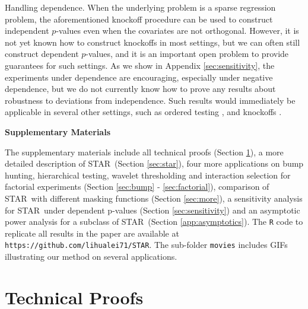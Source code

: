 \documentclass{biometrika}
\renewcommand{\star}{STAR}
\newcommand{\website}{\texttt{https://github.com/lihualei71/STAR}}
\newcommand{\1}{\mathbf{1}}
\begin{document}
\vspace{0.05in}

Handling dependence.
When the underlying problem is a sparse regression problem, the aforementioned knockoff procedure can be used to construct independent $p$-values even when the covariates are not orthogonal.
However, it is not yet known how to construct knockoffs in most settings, but we can often still construct dependent $p$-values, and it is an important open problem to provide guarantees for such settings. 
As we show in Appendix \ref{sec:sensitivity}, the experiments under dependence are encouraging, especially under negative dependence, but we do not currently know how to prove any results about robustness to deviations from independence. Such results would immediately be applicable in several other settings, such as ordered testing \citep{li2016accumulation}, and knockoffs \citep{barber15}.




\newpage
\allowdisplaybreaks
\appendix

\begin{center}
  \begin{Large}
    \textbf{Supplementary Materials}
  \end{Large}
\end{center}

The supplementary materials include all technical proofs (Section \ref{sec:proofs}), a more detailed description of \star ~(Section \ref{sec:star}), four more applications on bump hunting, hierarchical testing, wavelet thresholding and interaction selection for factorial experiments (Section \ref{sec:bump} - \ref{sec:factorial}), comparison of \star ~with different masking functions (Section \ref{sec:more}), a sensitivity analysis for \star ~under dependent p-values (Section \ref{sec:sensitivity}) and an asymptotic power analysis for a subclass of \star ~(Section \ref{app:asymptotics}). The \texttt{R} code to replicate all results in the paper are available at \website. The sub-folder \texttt{movies} includes GIFs illustrating our method on several applications.

\section{Technical Proofs}\label{sec:proofs}
\end{document}
